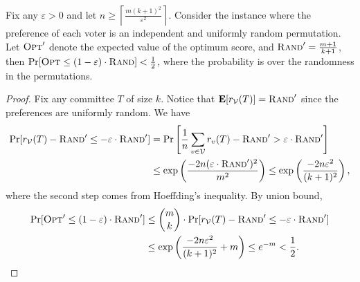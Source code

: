 \begin{lemma}
Fix any $\varepsilon > 0$ and let $n \ge \left\lceil\frac{m(k + 1)^2}{\varepsilon^2}\right\rceil$. Consider the instance where the preference of each voter is an independent and uniformly random permutation. Let ${\normalfont\textsc{Opt}}'$ denote the expected value of the optimum score, and ${\normalfont\textsc{Rand}}' = \frac{m+1}{k+1}$, then $\Pr[{\normalfont\textsc{Opt}} \leq (1 - \varepsilon) \cdot {\normalfont\textsc{Rand}}] < \frac{1}{2}$, where the probability is over the randomness in the permutations.
\label{lem:random_construction}
\end{lemma}
\begin{proof}
Fix any committee $T$ of size $k$. Notice that $\operatorname{\mathbf{E}}[r_{\mathcal{V}}(T)] = {\normalfont\textsc{Rand}}'$ since the preferences are uniformly random. We have
\begin{align*}
\Pr[r_{\mathcal{V}}(T) - {\normalfont\textsc{Rand}}' \leq -\varepsilon \cdot {\normalfont\textsc{Rand}}'] &= \Pr\left[\frac{1}{n}\sum_{v \in \mathcal{V}} r_v(T) - {\normalfont\textsc{Rand}}' > \varepsilon \cdot {\normalfont\textsc{Rand}}'\right]\\
& \leq \exp\left(\frac{-2n (\varepsilon \cdot {\normalfont\textsc{Rand}}')^2}{m^2}\right) \leq \exp\left(\frac{-2n \varepsilon^2}{(k + 1)^2}\right),
\end{align*}
where the second step comes from Hoeffding's inequality. By union bound,
\begin{align*}
\Pr[{\normalfont\textsc{Opt}}' \leq (1 - \varepsilon) \cdot {\normalfont\textsc{Rand}}'] &\leq \binom{m}{k} \cdot \Pr[r_{\mathcal{V}}(T) - {\normalfont\textsc{Rand}}' \leq -\varepsilon \cdot {\normalfont\textsc{Rand}}']\\
&\leq \exp\left(\frac{-2n \varepsilon^2}{(k + 1)^2} + m\right)\leq e^{-m} < \frac{1}{2}. \qedhere
\end{align*}
\end{proof}

